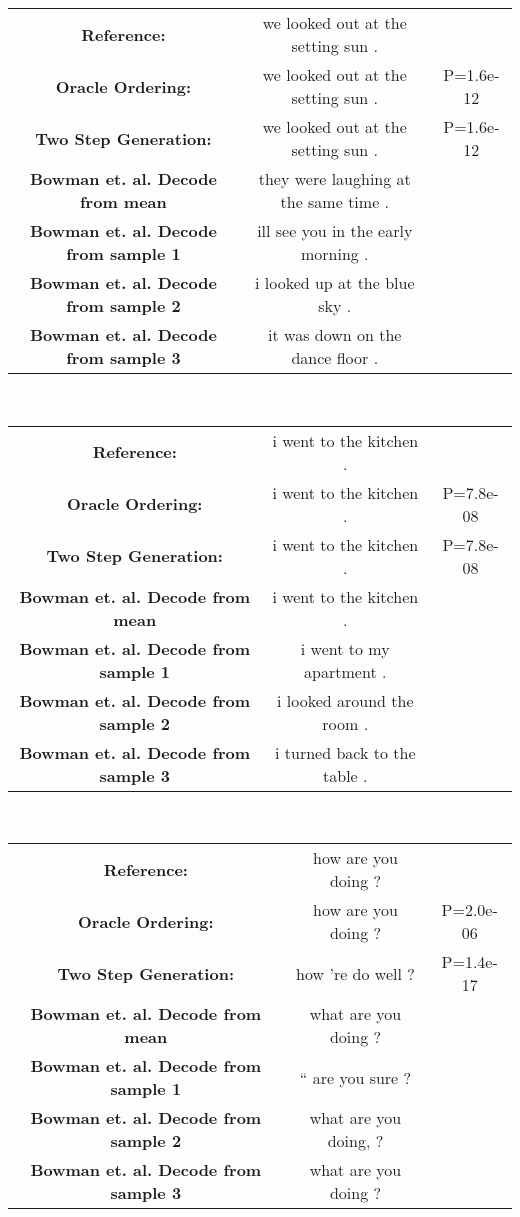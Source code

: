 \documentclass{article}
\begin{document}
\begin{tabular}{ c c c }
\textbf{Reference:	}  & we looked out at the setting sun . &  \\
\textbf{Oracle Ordering: 	}  & we looked out at the setting sun . & P=1.6e-12 \\
\textbf{Two Step Generation:	}  & we looked out at the setting sun . & P=1.6e-12 \\
\textbf{Bowman et. al. Decode from mean}  & they were laughing at the same time . &  \\
\textbf{Bowman et. al. Decode from sample 1}  & ill see you in the early morning . &  \\
\textbf{Bowman et. al. Decode from sample 2}  & i looked up at the blue sky . &  \\
\textbf{Bowman et. al. Decode from sample 3}  & it was down on the dance floor . &  \\
\end{tabular} \\
\vspace{10em}
\begin{tabular}{ c c c }
\textbf{Reference:	}  & i went to the kitchen . &  \\
\textbf{Oracle Ordering: 	}  & i went to the kitchen . & P=7.8e-08 \\
\textbf{Two Step Generation:	}  & i went to the kitchen . & P=7.8e-08 \\
\textbf{Bowman et. al. Decode from mean}  & i went to the kitchen . &  \\
\textbf{Bowman et. al. Decode from sample 1}  & i went to my apartment .  &  \\
\textbf{Bowman et. al. Decode from sample 2}  & i looked around the room . &  \\
\textbf{Bowman et. al. Decode from sample 3}  & i turned back to the table . &  \\
\end{tabular} \\

\begin{tabular}{ c c c }
\textbf{Reference:	}  & how are you doing ? &  \\
\textbf{Oracle Ordering: 	}  & how are you doing ? & P=2.0e-06 \\
\textbf{Two Step Generation:	}  & how 're do well ? & P=1.4e-17 \\
\textbf{Bowman et. al. Decode from mean}  & what are you doing ? &  \\
\textbf{Bowman et. al. Decode from sample 1}  & “ are you sure ? &  \\
\textbf{Bowman et. al. Decode from sample 2}  & what are you doing, ? &  \\
\textbf{Bowman et. al. Decode from sample 3}  & what are you doing ? &  \\
\end{tabular} \\
\end{document}
